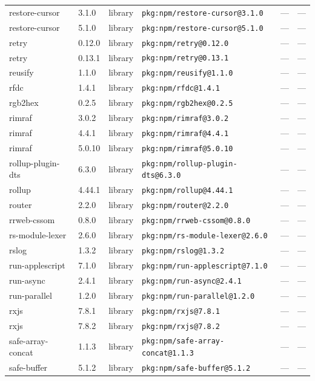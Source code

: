\documentclass[11pt]{article}
\begin{document}
\begin{longtable}{|l|l|l|p{2.2cm}|l|p{4cm}|}
restore-cursor & 3.1.0 & library & \texttt{pkg:npm/restore-cursor@3.1.0} & — & — \\
restore-cursor & 5.1.0 & library & \texttt{pkg:npm/restore-cursor@5.1.0} & — & — \\
retry & 0.12.0 & library & \texttt{pkg:npm/retry@0.12.0} & — & — \\
retry & 0.13.1 & library & \texttt{pkg:npm/retry@0.13.1} & — & — \\
reusify & 1.1.0 & library & \texttt{pkg:npm/reusify@1.1.0} & — & — \\
rfdc & 1.4.1 & library & \texttt{pkg:npm/rfdc@1.4.1} & — & — \\
rgb2hex & 0.2.5 & library & \texttt{pkg:npm/rgb2hex@0.2.5} & — & — \\
rimraf & 3.0.2 & library & \texttt{pkg:npm/rimraf@3.0.2} & — & — \\
rimraf & 4.4.1 & library & \texttt{pkg:npm/rimraf@4.4.1} & — & — \\
rimraf & 5.0.10 & library & \texttt{pkg:npm/rimraf@5.0.10} & — & — \\
rollup-plugin-dts & 6.3.0 & library & \texttt{pkg:npm/rollup-plugin-dts@6.3.0} & — & — \\
rollup & 4.44.1 & library & \texttt{pkg:npm/rollup@4.44.1} & — & — \\
router & 2.2.0 & library & \texttt{pkg:npm/router@2.2.0} & — & — \\
rrweb-cssom & 0.8.0 & library & \texttt{pkg:npm/rrweb-cssom@0.8.0} & — & — \\
rs-module-lexer & 2.6.0 & library & \texttt{pkg:npm/rs-module-lexer@2.6.0} & — & — \\
rslog & 1.3.2 & library & \texttt{pkg:npm/rslog@1.3.2} & — & — \\
run-applescript & 7.1.0 & library & \texttt{pkg:npm/run-applescript@7.1.0} & — & — \\
run-async & 2.4.1 & library & \texttt{pkg:npm/run-async@2.4.1} & — & — \\
run-parallel & 1.2.0 & library & \texttt{pkg:npm/run-parallel@1.2.0} & — & — \\
rxjs & 7.8.1 & library & \texttt{pkg:npm/rxjs@7.8.1} & — & — \\
rxjs & 7.8.2 & library & \texttt{pkg:npm/rxjs@7.8.2} & — & — \\
safe-array-concat & 1.1.3 & library & \texttt{pkg:npm/safe-array-concat@1.1.3} & — & — \\
safe-buffer & 5.1.2 & library & \texttt{pkg:npm/safe-buffer@5.1.2} & — & — \\

\end{longtable}
\end{document}
